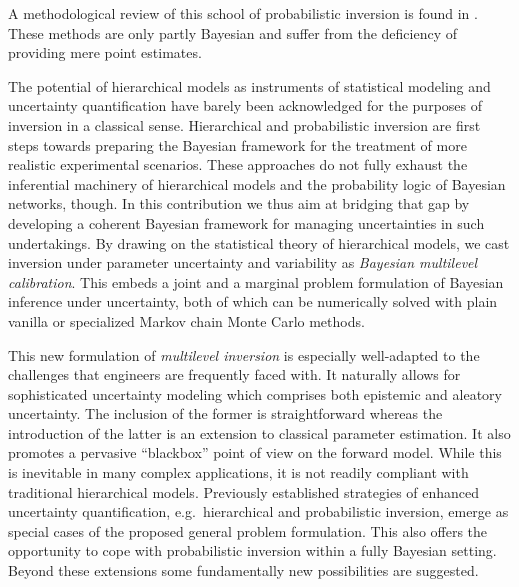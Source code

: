 A methodological review of this school of probabilistic inversion is found in \cite{Uncertainty:Rocquigny2012}.
These methods are only partly Bayesian and suffer from the deficiency of providing mere point estimates.
\par %
The potential of hierarchical models as instruments of statistical modeling and uncertainty quantification have barely been acknowledged for the purposes of inversion in a classical sense.
Hierarchical and probabilistic inversion are first steps towards preparing the Bayesian framework for the treatment of more realistic experimental scenarios.
These approaches do not fully exhaust the inferential machinery of hierarchical models and the probability logic of Bayesian networks, though.
In this contribution we thus aim at bridging that gap by developing a coherent Bayesian framework for managing uncertainties in such undertakings.
By drawing on the statistical theory of hierarchical models, we cast inversion under parameter uncertainty and variability as \textit{Bayesian multilevel calibration}.
This embeds a joint and a marginal problem formulation of Bayesian inference under uncertainty, both of which can be numerically solved with plain vanilla or specialized Markov chain Monte Carlo methods.
\par %
This new formulation of \textit{multilevel inversion} is especially well-adapted to the challenges that engineers are frequently faced with.
It naturally allows for sophisticated uncertainty modeling which comprises both epistemic and aleatory uncertainty.
The inclusion of the former is straightforward whereas the introduction of the latter is an extension to classical parameter estimation.
It also promotes a pervasive ``blackbox'' point of view on the forward model.
While this is inevitable in many complex applications, it is not readily compliant with traditional hierarchical models.
Previously established strategies of enhanced uncertainty quantification, e.g.\ hierarchical and probabilistic inversion, emerge as special cases of the proposed general problem formulation.
This also offers the opportunity to cope with probabilistic inversion within a fully Bayesian setting.
Beyond these extensions some fundamentally new possibilities are suggested.
